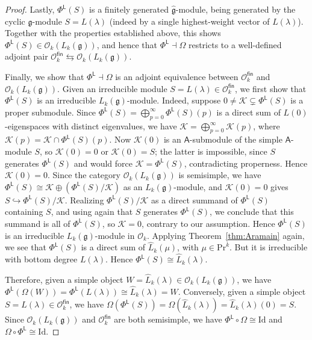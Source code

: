 \documentclass[12pt,a4paper,reqno]{amsart}
\numberwithin{equation}{section}
\theoremstyle{definition}
\newcommand{\g}{\mathfrak{g}}
\newcommand{\C}{\mathbb{C}}
\def\O{\mathcal{O}}
\def\fin{\mathsf{fin}}
\def\L{\mathsf{L}}
\def\Om{\Omega}
\def\Pr{\mathrm{Pr}}
\def\la{\lambda}
\def\o{\otimes}
\def\op{\oplus}
\def\Id{\mathrm{Id}}
\def\A{\mathsf{A}}
\begin{document}
\begin{proof}
Lastly, $\Phi^\L(S)$ is a finitely generated $\hat{\g}$-module, being generated by the cyclic $\g$-module $S=L(\la)$ (indeed by a single highest-weight vector of $L(\la)$). Together with the properties established above, this shows $\Phi^\L(S)\in \O_k(L_k(\g))$, and hence that $\Phi^\L\dashv \Om$ restricts to a well-defined adjoint pair $\O_k^\fin\leftrightarrows \O_k(L_k(\g))$.

Finally, we show that $\Phi^\L\dashv \Om$ is an adjoint equivalence between $\O_k^\fin$ and $\O_k(L_k(\g))$.
Given an irreducible module $S=L(\la)\in \O_k^\fin$,
we first show that $\Phi^\L(S)$ is an irreducible $L_k(\g)$-module. Indeed, suppose $0\neq \mathcal{K}\subsetneq \Phi^\L(S)$ is a proper submodule.
Since $\Phi^\L(S)=\bigoplus_{p=0}^\infty \Phi^\L(S)(p)$ is a direct sum of $L(0)$-eigenspaces with distinct eigenvalues, we have $\mathcal{K}=\bigoplus_{p=0}^\infty \mathcal{K}(p)$, where $\mathcal{K}(p)=\mathcal{K}\cap \Phi^\L(S)(p)$. Now $\mathcal{K}(0)$ is an $\A$-submodule of the simple $\A$-module $S$, so $\mathcal{K}(0)=0$ or $\mathcal{K}(0)=S$; the latter is impossible, since $S$ generates $\Phi^\L(S)$ and would force $\mathcal{K}=\Phi^\L(S)$, contradicting properness. Hence $\mathcal{K}(0)=0$. Since the category $\O_k(L_k(\g))$ is semisimple, we have $\Phi^\L(S)\cong \mathcal{K}\op (\Phi^\L(S)/\mathcal{K})$ as an $L_k(\g)$-module, and $\mathcal{K}(0)=0$ gives $S\hookrightarrow \Phi^\L(S)/\mathcal{K}$. Realizing $\Phi^\L(S)/\mathcal{K}$ as a direct summand of $\Phi^\L(S)$ containing $S$, and using again that $S$ generates $\Phi^\L(S)$, we conclude that this summand is all of $\Phi^\L(S)$, so $\mathcal{K}=0$, contrary to our assumption. Hence $\Phi^\L(S)$ is an irreducible $L_k(\g)$-module in $\O_k$. Applying Theorem~\ref{thm:Aramain} again, we see that $\Phi^\L(S)$ is a direct sum of $\hat{L}_k(\mu)$, with $\mu\in \Pr^k$. But it is irreducible with bottom degree $L(\la)$. Hence $\Phi^\L(S)\cong\hat{L}_k(\la)$.


Therefore, given a simple object $W=\hat{L}_k(\la)\in \O_k(L_k(\g))$, we have $\Phi^\L(\Om(W))=\Phi^\L(L(\la))\cong \hat{L}_k(\la)=W$. Conversely, given a simple object $S=L(\la)\in \O_k^\fin$, we have $\Om(\Phi^\L(S))=\Om(\hat{L}_k(\la))=\hat{L}_k(\la)(0)=S$. Since $\O_k(L_k(\g))$ and $\O_k^\fin$ are both semisimple, we have $\Phi^\L\circ \Om\cong \Id$ and $\Om\circ \Phi^\L\cong \Id$. 
\end{proof}
\end{document}

